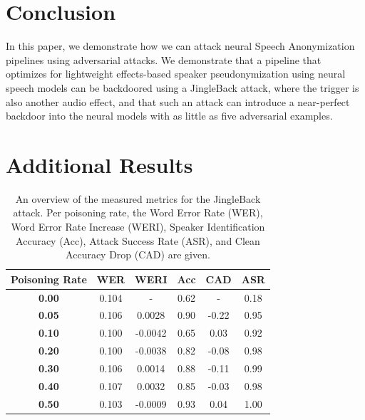 \documentclass[11pt]{article}
\begin{document}
\section{Conclusion}
In this paper, we demonstrate how we can attack neural Speech Anonymization pipelines using adversarial attacks.
We demonstrate that a pipeline that optimizes for lightweight effects-based speaker pseudonymization using neural speech models can be backdoored using a JingleBack attack, where the trigger is also another audio effect, and that such an attack can introduce a near-perfect backdoor into the neural models with as little as five adversarial examples.



\onecolumn
\appendix

\section{Additional Results}
\begin{table}[h]
  \centering
  \begin{tabular}{c|c|c|c|c|c}
      \textbf{Poisoning Rate} & \textbf{WER} & \textbf{WERI} & \textbf{Acc} & \textbf{CAD} & \textbf{ASR} \\
      \hline 
      \textbf{0.00} & 0.104 & - & 0.62 & - & 0.18 \\
      \textbf{0.05} & 0.106 & 0.0028 & 0.90 & -0.22 & 0.95 \\
      \textbf{0.10} & 0.100 & -0.0042 & 0.65 & 0.03 & 0.92 \\
      \textbf{0.20} & 0.100 & -0.0038 & 0.82 & -0.08 & 0.98 \\
      \textbf{0.30} & 0.106 & 0.0014 & 0.88 & -0.11 & 0.99 \\
      \textbf{0.40} & 0.107 & 0.0032 & 0.85 & -0.03 & 0.98 \\
      \textbf{0.50} & 0.103 & -0.0009 & 0.93 & 0.04 & 1.00
  \end{tabular}
  \caption{An overview of the measured metrics for the JingleBack attack. Per poisoning rate, the Word Error Rate (WER), Word Error Rate Increase (WERI), Speaker Identification Accuracy (Acc), Attack Success Rate (ASR), and Clean Accuracy Drop (CAD) are given.}
  \label{tab:backdoor_metrics}
\end{table}
\end{document}
